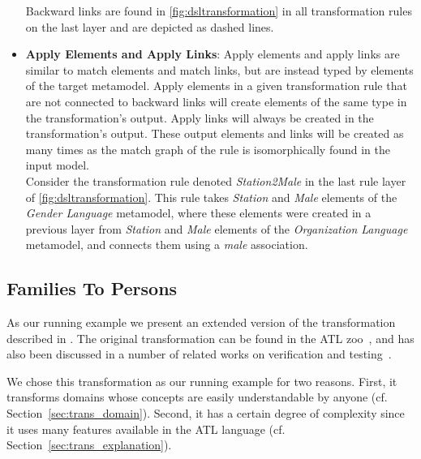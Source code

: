 \begin{itemize}
Backward links are found in \cref{fig:dsltransformation} in all transformation rules on the last layer and are depicted as dashed lines.\\


\item \textbf{Apply Elements and Apply Links}: Apply elements and apply links are similar to match elements and
match links, but are instead typed by elements of the target metamodel. Apply elements in a given transformation rule that are not connected to backward links will create elements of the same type in the transformation's output. Apply links will always be created in the transformation's output. These output elements and links will be created as many times as the match graph of the rule is isomorphically found in the input model.\\

Consider the transformation rule denoted \emph{Station2Male} in the last rule
layer of \cref{fig:dsltransformation}. This rule takes \emph{Station} and
\emph{Male} elements of the \emph{Gender Language} metamodel, where these
elements were created in a previous layer from \emph{Station} and \emph{Male}
elements of the \emph{Organization Language} metamodel, and connects them using a
\emph{male} association.

\end{itemize}


\subsection{Families To Persons}

As our running example we present an extended version of the \FTP
transformation described in \cite{Oakes2015}. The original \FTP transformation can be
found in the ATL zoo~\cite{atlZoo}, and has also been discussed in a number of related works
on verification and testing~\cite{Gogolla2011}.

We chose this \FTP transformation as our running example for two reasons. First, it transforms domains whose concepts are easily understandable by anyone (cf. Section~\ref{sec:trans_domain}).
Second, it has a certain degree of complexity since it uses many features available in the ATL language (cf. Section~\ref{sec:trans_explanation}).


